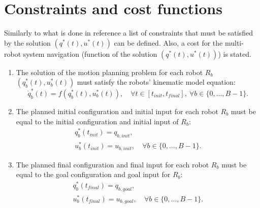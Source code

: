 \section{Constraints and cost functions}\label{sec:constr}

Similarly to what is done in reference \cite{Defoort2009} a list of constraints
that must be satisfied by the solution $(q^{*}(t), u^{*}(t))$ can be defined. Also, a cost for the multi-robot system navigation (function of the solution $(q^{*}(t), u^{*}(t))$) is stated.

\begin{enumerate}

    \item The solution of the motion planning problem
    for each robot $R_b$ $(q^{*}_b(t), u^{*}_b(t))$ must satisfy the
    robots' kinematic model equation:
    \begin{equation}\label{eq:kinematic}
        \dot{q}^{*}_b(t) = f(q^{*}_b(t),u^{*}_b(t)),\quad \forall t \in [t_{init}, t_{final}],\ \forall b \in \{0,\dots,B-1\}.
    \end{equation}
    
    \item The planned initial configuration and initial 
    input for each robot $R_b$ must
    be equal to the initial configuration and initial
    input of $R_b$:
    \begin{align}
        q^{*}_{b}(t_{init}) = q_{b,init},&\\
        u^{*}_{b}(t_{init}) = u_{b,init},& \ \forall b \in \{0,\dots,B-1\}.
    \end{align}

    \item The planned final configuration and final 
    input for each robot $R_b$ must
    be equal to the goal configuration and goal
    input for $R_b$:
    \begin{align}
        q^{*}_{b}(t_{final}) = q_{b,goal},&\label{eq:finalconfig}\\
        u^{*}_{b}(t_{final}) = u_{b,goal},& \ \forall b \in \{0,\dots,B-1\}.\label{eq:finalinput}
    \end{align}


\end{enumerate}
